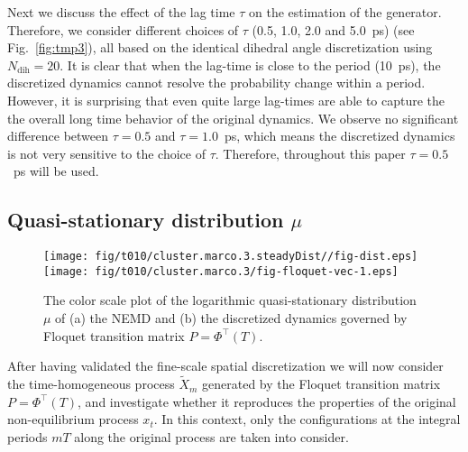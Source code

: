 \documentclass[aps, pre, preprint,unsortedaddress,a4paper,onecolumn]{revtex4}
\newcommand{\vect}[1]{#1}
\newcommand{\myphi}{\Phi}
\newcommand{\mymu}{\mu}
\newcommand{\dih}{\textrm{dih}}
\begin{document}
Next we discuss the effect of the lag time $\tau$ on the estimation of the generator. Therefore, we consider 
different choices of $\tau$ (0.5, 1.0, 2.0 and 5.0~ps)
(see Fig.~\ref{fig:tmp3}), all based on the identical dihedral angle discretization using $N_\dih=20$.
It is clear that when the lag-time is close to the period (10~ps), the
discretized dynamics cannot resolve the probability change within a
period. However, it is surprising  that even quite large lag-times are able to capture the
the overall long time behavior of the original dynamics.
We observe no significant difference between $\tau=0.5$ and
$\tau=1.0$~ps, which means the discretized dynamics is not very sensitive
to the choice of $\tau$.
Therefore, throughout this paper $\tau=0.5$~ps will be used.



\subsection{Quasi-stationary distribution $\mymu$}


\begin{figure}
  \centering  
  \texttt{[image: fig/t010/cluster.marco.3.steadyDist//fig-dist.eps]}
  \texttt{[image: fig/t010/cluster.marco.3/fig-floquet-vec-1.eps]}
  \caption{The color scale plot of the logarithmic quasi-stationary distribution $\mymu$
    of (a) the NEMD  and (b)
    the discretized dynamics governed by Floquet transition matrix $\vect P=\myphi^{\top}(T)$.
  }
  \label{fig:num-1}
\end{figure}

After having validated the fine-scale spatial discretization 
we will now consider the time-homogeneous process $\tilde X_{m}$ generated by
the Floquet transition matrix $P = \Phi^{\top}(T)$, and investigate whether it
reproduces the properties of the original  non-equilibrium process $x_t$.
In this context, only the configurations at the  integral periods $mT$ along the original process
are taken into consider.
\end{document}
